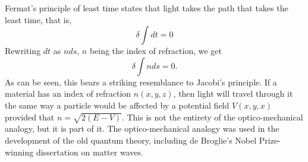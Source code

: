 \documentclass{article}
\begin{document}
Fermat's principle of least time states that light takes the path that takes the least time, that is,
\begin{equation}
\delta\int dt=0
\end{equation}
Rewriting $dt$ as $n ds$, $n$ being the index of refraction, we get
\begin{equation}
\delta\int nds=0.
\end{equation}
As can be seen, this bears a striking resemblance to Jacobi's principle. If a material has an index of refraction $n(x,y,z)$, then light will travel through it the same way a particle would be affected by a potential field $V(x,y,x)$ provided that $n=\sqrt{2(E-V)}.$ This is not the entirety of the optico-mechanical analogy, but it is part of it. The optico-mechanical analogy was used in the development of the old quantum theory, including de Broglie's Nobel Prize-winning dissertation on matter waves.
\end{document}
